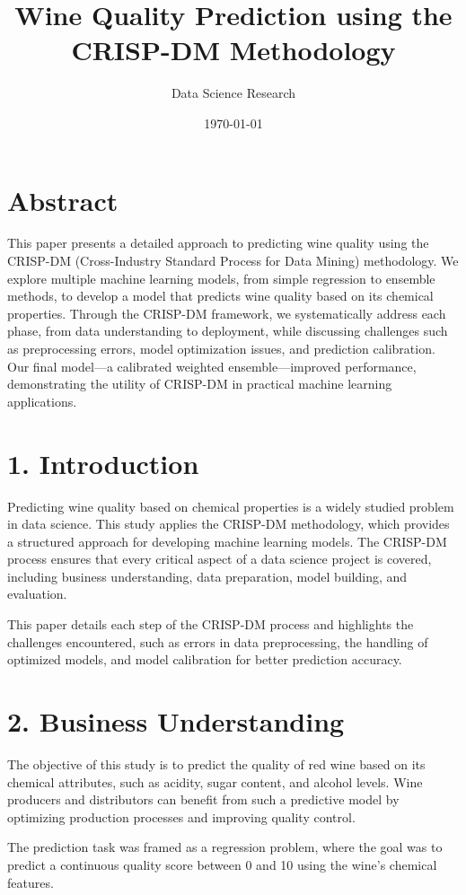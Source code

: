 \documentclass{article}
\title{Wine Quality Prediction using the CRISP-DM Methodology}
\author{Data Science Research}
\date{\today}
\begin{document}
\maketitle

\section*{Abstract}
This paper presents a detailed approach to predicting wine quality using the CRISP-DM (Cross-Industry Standard Process for Data Mining) methodology. We explore multiple machine learning models, from simple regression to ensemble methods, to develop a model that predicts wine quality based on its chemical properties. Through the CRISP-DM framework, we systematically address each phase, from data understanding to deployment, while discussing challenges such as preprocessing errors, model optimization issues, and prediction calibration. Our final model—a calibrated weighted ensemble—improved performance, demonstrating the utility of CRISP-DM in practical machine learning applications.

\section{1. Introduction}
Predicting wine quality based on chemical properties is a widely studied problem in data science. This study applies the CRISP-DM methodology, which provides a structured approach for developing machine learning models. The CRISP-DM process ensures that every critical aspect of a data science project is covered, including business understanding, data preparation, model building, and evaluation.

This paper details each step of the CRISP-DM process and highlights the challenges encountered, such as errors in data preprocessing, the handling of optimized models, and model calibration for better prediction accuracy.

\section{2. Business Understanding}
The objective of this study is to predict the quality of red wine based on its chemical attributes, such as acidity, sugar content, and alcohol levels. Wine producers and distributors can benefit from such a predictive model by optimizing production processes and improving quality control.

The prediction task was framed as a regression problem, where the goal was to predict a continuous quality score between 0 and 10 using the wine’s chemical features.
\end{document}
